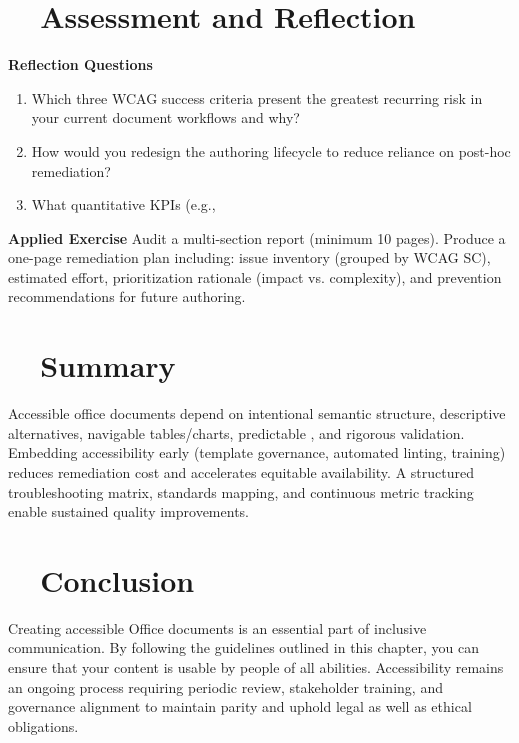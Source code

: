 \section{~~Assessment and Reflection}\label{ch15:sec:assessment-reflection}
\textbf{Reflection Questions}
\begin{enumerate}
	\item Which three WCAG success criteria present the greatest recurring risk in your current document workflows and why?
	\item How would you redesign the authoring lifecycle to reduce reliance on post-hoc remediation?
	\item What quantitative KPIs (e.g., %
\end{enumerate}
\textbf{Applied Exercise} Audit a multi-section report (minimum 10 pages). Produce a one-page remediation plan including: issue inventory (grouped by WCAG SC), estimated effort, prioritization rationale (impact vs. complexity), and prevention recommendations for future authoring.

\section{~~Summary}\label{ch15:sec:summary}
Accessible office documents depend on intentional semantic structure, descriptive alternatives, navigable tables/charts, predictable , and rigorous validation. Embedding accessibility early (template governance, automated linting, training) reduces remediation cost and accelerates equitable availability. A structured troubleshooting matrix, standards mapping, and continuous metric tracking enable sustained quality improvements.

\section{~~Conclusion}\label{ch15:sec:conclusion}
Creating accessible Office documents is an essential part of inclusive communication. By following the guidelines outlined in this chapter, you can ensure that your content is usable by people of all abilities. Accessibility remains an ongoing process requiring periodic review, stakeholder training, and governance alignment to maintain parity and uphold legal as well as ethical obligations.

